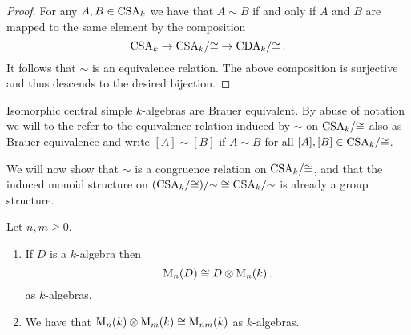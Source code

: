 \begin{proof}
  For any $A, B \in \operatorname{CSA}_k$ we have that $A \sim B$ if and only if $A$ and $B$ are mapped to the same element by the composition
  \[
        \operatorname{CSA}_k
    \to \operatorname{CSA}_k\!/{\cong}
    \to \operatorname{CDA}_k\!/{\cong} \,.
  \]
  It follows that $\sim$ is an equivalence relation.
  The above composition is surjective and thus descends to the desired bijection.
\end{proof}


\begin{remark}
  Isomorphic central simple $k$-algebras are Brauer equivalent.
  By abuse of notation we will to the refer to the equivalence relation induced by $\sim$ on $\operatorname{CSA}_k\!/{\cong}$ also as Brauer equivalence and write $[A] \sim [B]$ if $A \sim B$ for all $[A], [B] \in \operatorname{CSA}_k\!/{\cong}$.
\end{remark}


\begin{fluff}
  We will now show that $\sim$ is a congruence relation on $\operatorname{CSA}_k\!/{\cong}$, and that the induced monoid structure on $(\operatorname{CSA}_k\!/{\cong})/{\sim} \cong \operatorname{CSA}_k\!/{\sim}$ is already a group structure.
\end{fluff}


\begin{lemma}
  Let $n, m \geq 0$.
  \begin{enumerate}
    \item
      If $D$ is a $k$-algebra then
      \[
              \operatorname{M}_n(D)
        \cong D \otimes \operatorname{M}_n(k) \,.
      \]
      as $k$-algebras.
    \item
      We have that $\operatorname{M}_n(k) \otimes \operatorname{M}_m(k) \cong \operatorname{M}_{nm}(k)$ as $k$-algebras.
  \end{enumerate}
\end{lemma}


